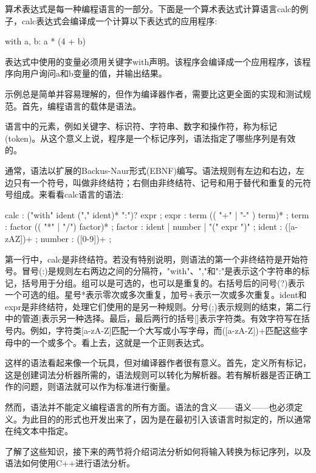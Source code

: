 
算术表达式是每一种编程语言的一部分。下面是一个算术表达式计算语言calc的例子，calc表达式会编译成一个计算以下表达式的应用程序:

\begin{shell}
with a, b: a * (4 + b)
\end{shell}

表达式中使用的变量必须用关键字with声明。该程序会编译成一个应用程序，该程序向用户询问a和b变量的值，并输出结果。

示例总是简单并容易理解的，但作为编译器作者，需要比这更全面的实现和测试规范。首先，编程语言的载体是语法。


语言中的元素，例如关键字、标识符、字符串、数字和操作符，称为标记(token)。从这个意义上说，程序是一个标记序列，语法指定了哪些序列是有效的。

通常，语法以扩展的Backus-Naur形式(EBNF)编写。语法规则有左边和右边，左边只有一个符号，叫做非终结符；右侧由非终结符、记号和用于替代和重复的元符号组成。来看看calc语言的语法:

\begin{shell}
calc : ("with" ident ("," ident)* ":")? expr ;
expr : term (( "+" | "-" ) term)* ;
term : factor (( "*" | "/") factor)* ;
factor : ident | number | "(" expr ")" ;
ident : ([a-zAZ])+ ;
number : ([0-9])+ ;
\end{shell}

第一行中，calc是非终结符。若没有特别说明，则语法的第一个非终结符是开始符号。冒号(:)是规则左右两边之间的分隔符，"with"、","和":"是表示这个字符串的标记，括号用于分组。组可以是可选的，也可以是重复的。右括号后的问号(?)表示一个可选的组。星号*表示零次或多次重复，加号+表示一次或多次重复。ident和expr是非终结符，处理它们使用的是另一种规则。分号(;)表示规则的结束，第二行中的管道|表示另一种选择。最后，最后两行的括号[]表示字符类。有效字符写在括号内。例如，字符类[a-zA-Z]匹配一个大写或小写字母，而([a-zA-Z])+匹配这些字母中的一个或多个。看上去，这就是一个正则表达式。


这样的语法看起来像一个玩具，但对编译器作者很有意义。首先，定义所有标记，这是创建词法分析器所需的，语法规则可以转化为解析器。若有解析器是否正确工作的问题，则语法就可以作为标准进行衡量。

然而，语法并不能定义编程语言的所有方面。语法的含义——语义——也必须定义。为此目的的形式也开发出来了，因为是在最初引入该语言时拟定的，所以通常在纯文本中指定。

了解了这些知识，接下来的两节将介绍词法分析如何将输入转换为标记序列，以及语法如何使用C++进行语法分析。